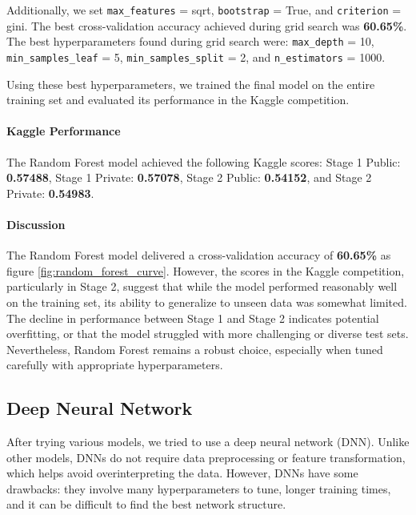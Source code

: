 \documentclass[10pt,a4paper]{article}
\begin{document}
Additionally, we set \texttt{max\_features} = sqrt, \texttt{bootstrap} = True, and \texttt{criterion} = gini. The best cross-validation accuracy achieved during grid search was \textbf{60.65\%}. The best hyperparameters found during grid search were: \texttt{max\_depth} = 10, \texttt{min\_samples\_leaf} = 5, \texttt{min\_samples\_split} = 2, and \texttt{n\_estimators} = 1000.

Using these best hyperparameters, we trained the final model on the entire training set and evaluated its performance in the Kaggle competition.

\paragraph{Kaggle Performance}

The Random Forest model achieved the following Kaggle scores: Stage 1 Public: \textbf{0.57488}, Stage 1 Private: \textbf{0.57078}, Stage 2 Public: \textbf{0.54152}, and Stage 2 Private: \textbf{0.54983}.

\paragraph{Discussion}

The Random Forest model delivered a cross-validation accuracy of \textbf{60.65\%} as figure \ref{fig:random_forest_curve}.
However, the scores in the Kaggle competition, particularly in Stage 2, suggest that while the model performed reasonably well on the training set, its ability to generalize to unseen data was somewhat limited. The decline in performance between Stage 1 and Stage 2 indicates potential overfitting, or that the model struggled with more challenging or diverse test sets. Nevertheless, Random Forest remains a robust choice, especially when tuned carefully with appropriate hyperparameters.




\subsection{Deep Neural Network}

After trying various models, we tried to use a deep neural network (DNN). Unlike other models, DNNs do not require data preprocessing or feature transformation, which helps avoid overinterpreting the data. However, DNNs have some drawbacks: they involve many hyperparameters to tune, longer training times, and it can be difficult to find the best network structure.
\end{document}
